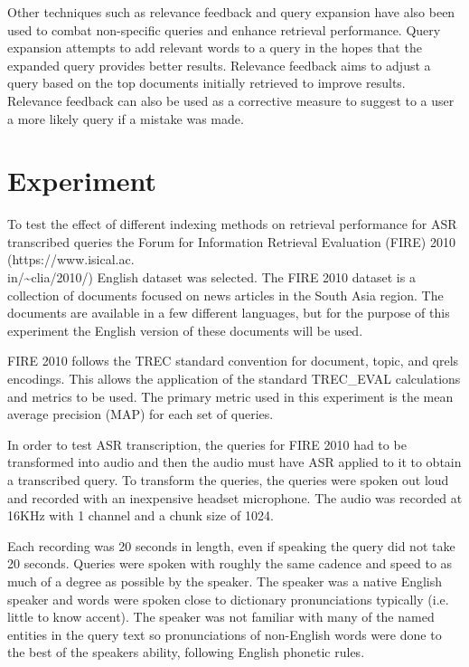 \documentclass[jair, twoside,11pt,theapa]{article}
\begin{document}
Other techniques such as relevance feedback and query expansion have also been used to combat non-specific queries and enhance retrieval performance. Query expansion attempts to add relevant words to a query in the hopes that the expanded query provides better results. Relevance feedback aims to adjust a query based on the top documents initially retrieved to improve results. Relevance feedback can also be used as a corrective measure to suggest to a user a more likely query if a mistake was made. 


\section{Experiment}
\label{Experiment}
To test the effect of different indexing methods on retrieval performance for ASR transcribed queries the Forum for Information Retrieval Evaluation (FIRE) 2010 (https://www.isical.ac.\\in/\textasciitilde{}clia/2010/) English dataset was selected. The FIRE 2010 dataset is a collection of documents focused on news articles in the South Asia region. The documents are available in a few different languages, but for the purpose of this experiment the English version of these documents will be used. 

FIRE 2010 follows the TREC standard convention for document, topic, and qrels encodings. This allows the application of the standard TREC\_EVAL calculations and metrics to be used. The primary metric used in this experiment is the mean average precision (MAP) for each set of queries. 

In order to test ASR transcription, the queries for FIRE 2010 had to be transformed into audio and then the audio must have ASR applied to it to obtain a transcribed query. To transform the queries, the queries were spoken out loud and recorded with an inexpensive headset microphone. The audio was recorded at 16KHz with 1 channel and a chunk size of 1024. 

Each recording was 20 seconds in length, even if speaking the query did not take 20 seconds. Queries were spoken with roughly the same cadence and speed to as much of a degree as possible by the speaker. The speaker was a native English speaker and words were spoken close to dictionary pronunciations typically (i.e. little to know accent). The speaker was not familiar with many of the named entities in the query text so pronunciations of non-English words were done to the best of the speakers ability, following English phonetic rules. 
\end{document}
